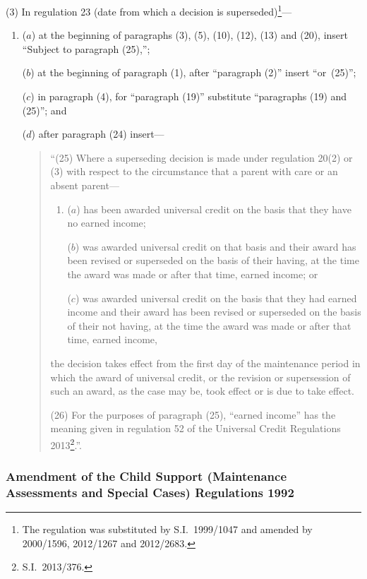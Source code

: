 \documentclass[12pt,a4paper]{article}
\begin{document}
(3) In regulation 23 (date from which a decision is superseded)\footnote{The regulation was substituted by S.I.~1999/1047 and amended by 2000/1596, 2012/1267 and 2012/2683.}—
\begin{enumerate}\item[]
($a$) at the beginning of paragraphs (3), (5), (10), (12), (13) and (20), insert “Subject to paragraph (25),”;

($b$) at the beginning of paragraph (1), after “paragraph (2)” insert “or~(25)”;

($c$) in paragraph (4), for “paragraph (19)” substitute “paragraphs (19) and (25)”; and

($d$) after paragraph (24) insert—
\begin{quotation}
“(25) Where a superseding decision is made under regulation 20(2) or (3) with respect to the circumstance that a parent with care or an absent parent—
\begin{enumerate}\item[]
($a$) has been awarded universal credit on the basis that they have no earned income;

($b$) was awarded universal credit on that basis and their award has been revised or superseded on the basis of their having, at the time the award was made or after that time, earned income; or

($c$) was awarded universal credit on the basis that they had earned income and their award has been revised or superseded on the basis of their not having, at the time the award was made or after that time, earned income,
\end{enumerate}
the decision takes effect from the first day of the maintenance period in which the award of universal credit, or the revision or supersession of such an award, as the case may be, took effect or is due to take effect.

(26) For the purposes of paragraph (25), “earned income” has the meaning given in regulation 52 of the Universal Credit Regulations 2013\footnote{S.I.~2013/376.}.”.
\end{quotation}
\end{enumerate}

\subsubsection[41. Amendment of the Child Support (Maintenance Assessments and Special Cases) Regulations 1992]{Amendment of the Child Support (Maintenance Assessments and Special Cases) Regulations 1992}
\end{document}
